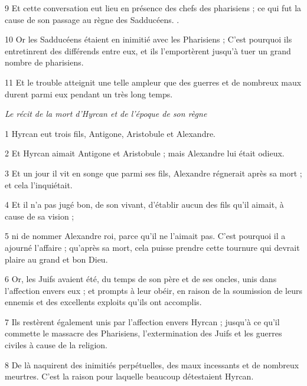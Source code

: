 \par 9 Et cette conversation eut lieu en présence des chefs des pharisiens ; ce qui fut la cause de son passage au règne des Sadducéens. .

\par 10 Or les Sadducéens étaient en inimitié avec les Pharisiens ; C'est pourquoi ils entretinrent des différends entre eux, et ils l'emportèrent jusqu'à tuer un grand nombre de pharisiens.

\par 11 Et le trouble atteignit une telle ampleur que des guerres et de nombreux maux durent parmi eux pendant un très long temps.


\par \textit{Le récit de la mort d'Hyrcan et de l'époque de son règne}

\par 1 Hyrcan eut trois fils, Antigone, Aristobule et Alexandre.

\par 2 Et Hyrcan aimait Antigone et Aristobule ; mais Alexandre lui était odieux.

\par 3 Et un jour il vit en songe que parmi ses fils, Alexandre régnerait après sa mort ; et cela l'inquiétait.

\par 4 Et il n'a pas jugé bon, de son vivant, d'établir aucun des fils qu'il aimait, à cause de sa vision ;

\par 5 ni de nommer Alexandre roi, parce qu'il ne l'aimait pas. C'est pourquoi il a ajourné l'affaire ; qu'après sa mort, cela puisse prendre cette tournure qui devrait plaire au grand et bon Dieu.

\par 6 Or, les Juifs avaient été, du temps de son père et de ses oncles, unis dans l'affection envers eux ; et prompts à leur obéir, en raison de la soumission de leurs ennemis et des excellents exploits qu'ils ont accomplis.

\par 7 Ils restèrent également unis par l'affection envers Hyrcan ; jusqu'à ce qu'il commette le massacre des Pharisiens, l'extermination des Juifs et les guerres civiles à cause de la religion.

\par 8 De là naquirent des inimitiés perpétuelles, des maux incessants et de nombreux meurtres. C’est la raison pour laquelle beaucoup détestaient Hyrcan.

